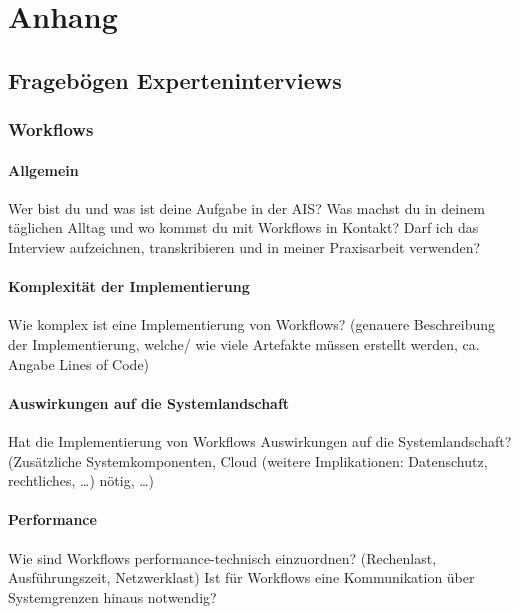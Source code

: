 \chapter{Anhang}

\section{Fragebögen Experteninterviews}

\subsection{Workflows} \label{FB_Workflows}

\subsubsection{Allgemein}

Wer bist du und was ist deine Aufgabe in der AIS? Was machst du in deinem täglichen Alltag und wo kommst du mit Workflows in Kontakt?
Darf ich das Interview aufzeichnen, transkribieren und in meiner Praxisarbeit verwenden?

\subsubsection{Komplexität der Implementierung}

Wie komplex ist eine Implementierung von Workflows? (genauere Beschreibung der Implementierung, welche/ wie viele Artefakte müssen erstellt werden, ca. Angabe Lines of Code)

\subsubsection{Auswirkungen auf die Systemlandschaft}

Hat die Implementierung von Workflows Auswirkungen auf die Systemlandschaft? (Zusätzliche Systemkomponenten, Cloud (weitere Implikationen: Datenschutz, rechtliches, …) nötig, …)

\subsubsection{Performance}

Wie sind Workflows performance-technisch einzuordnen? (Rechenlast, Ausführungszeit, Netzwerklast) \newline
Ist für Workflows eine Kommunikation über Systemgrenzen hinaus notwendig?

